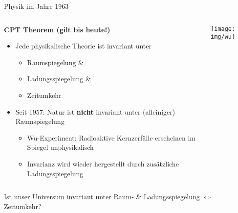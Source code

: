 \begin{frame}{Physik im Jahre 1963}
    \begin{columns}
        \begin{column}{.6\textwidth}
            \textbf{CPT Theorem (gilt bis heute!)}
            \begin{itemize}
                \item Jede physikalische Theorie ist invariant unter
                \begin{itemize}
                    \item Raumspiegelung \&
                    \item Ladungsspiegelung \&
                    \item Zeitumkehr
                \end{itemize}
                \item Seit 1957: Natur ist \textbf{nicht} invariant unter (alleiniger) Raumspiegelung
                \begin{itemize}
                    \item Wu-Experiment: Radioaktive Kernzerfälle erscheinen im Spiegel unphysikalisch
                    \item Invarianz wird wieder hergestellt durch zusätzliche Ladungsspiegelung
                \end{itemize}
            \end{itemize}
        \end{column}

        \begin{column}{.4\textwidth}
            \centering
            \texttt{[image: img/wu]}
            \scalebox{.4}{(Wu Experiment [Public domain])}
        \end{column}
    \end{columns}

    \vspace{5mm}
    \centering
    Ist unser Universum invariant unter Raum- \& Ladungsspiegelung $\Leftrightarrow$ Zeitumkehr?
\end{frame}

